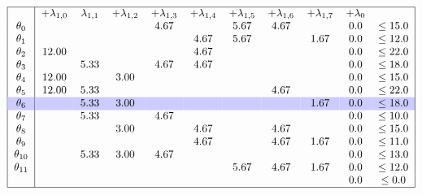 \documentclass{article}
\begin{document}
    \[
        \begin{tabular}{ |c|c c c c c c c c c c| }
            \hline
            & +$\lambda_{1,0}$ & $\lambda_{1,1}$ & +$\lambda_{1,2}$ & +$\lambda_{1,3}$ & +$\lambda_{1,4}$ & +$\lambda_{1,5}$ & +$\lambda_{1,6}$ & +$\lambda_{1,7}$  & +$\lambda_{0}$ &  \\
            $\theta_{0}$ && & & 4.67 && 5.67 &4.67 && 0.0& $\leq 15.0$ \\
            $\theta_{1}$ && & & & 4.67 &5.67 && 1.67 &0.0& $\leq 12.0$ \\
            $\theta_{2}$ &12.00 && & & 4.67 && & & 0.0& $\leq 22.0$ \\
            $\theta_{3}$ && 5.33 && 4.67 &4.67 && & & 0.0& $\leq 18.0$ \\
            $\theta_{4}$ &12.00 && 3.00 && & & & & 0.0& $\leq 15.0$ \\
            $\theta_{5}$ &12.00 &5.33 && & & & 4.67 && 0.0& $\leq 22.0$ \\
            \rowcolor{blue!20}
            $\theta_{6}$ && 5.33 &3.00 && & & & 1.67 &0.0& $\leq 18.0$ \\
            $\theta_{7}$ && 5.33 && 4.67 && & & & 0.0& $\leq 10.0$ \\
            $\theta_{8}$ && & 3.00 && 4.67 && 4.67 && 0.0& $\leq 15.0$ \\
            $\theta_{9}$ && & & & 4.67 && 4.67 &1.67 &0.0& $\leq 11.0$ \\
            $\theta_{10}$ && 5.33 &3.00 &4.67 && & & & 0.0& $\leq 13.0$ \\
            $\theta_{11}$ && & & & & 5.67 &4.67 &1.67 &0.0& $\leq 12.0$ \\
            && & & & &  && & 0.0 & $\leq 0.0$ \\
            \hline
        \end{tabular}
    \]
\end{document}
